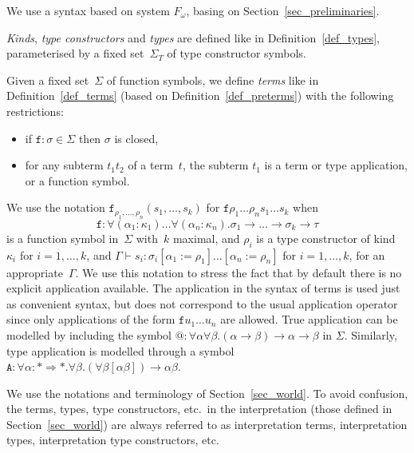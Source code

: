 \documentclass[runningheads,a4paper]{llncs}
\newcommand{\arrtype}{\rightarrow}
\newcommand{\arrkind}{\Rightarrow}
\newcommand{\proves}{\vdash}
\begin{document}
We use a syntax based on system $F_\omega$, basing on
Section~\ref{sec_preliminaries}.

\begin{definition}\normalfont
  \emph{Kinds}, \emph{type constructors} and \emph{types} are defined
  like in Definition~\ref{def_types}, parameterised by a fixed
  set~$\Sigma_T$ of type constructor symbols.

  Given a fixed set~$\Sigma$ of function symbols, we define
  \emph{terms} like in Definition~\ref{def_terms} (based on
  Definition~\ref{def_preterms}) with the following restrictions:
  \begin{itemize}
  \item if $\mathtt{f} : \sigma \in \Sigma$ then $\sigma$ is closed,
  \item for any subterm $t_1 t_2$ of a term~$t$, the subterm $t_1$ is
    a term or type application, or a function symbol.
  \end{itemize}
\end{definition}

We use the notation
$\mathtt{f}_{\rho_1,\ldots,\rho_n}(s_1,\ldots,s_k)$ for
$\mathtt{f} \rho_1 \ldots \rho_n s_1 \ldots s_k$ when
\[
  \mathtt{f} : \forall (\alpha_1 : \kappa_1) \ldots
  \forall (\alpha_n : \kappa_n) . \sigma_1 \arrtype \ldots \arrtype
  \sigma_k \arrtype \tau
\]
is a function symbol in~$\Sigma$ with~$k$ maximal, and $\rho_i$ is a
type constructor of kind $\kappa_i$ for $i=1,\ldots,k$, and
$\Gamma \proves s_i : \sigma_i[\alpha_1 := \rho_1]\ldots[\alpha_n :=
\rho_n]$ for $i=1,\ldots,k$, for an appropriate~$\Gamma$. We use this
notation to stress the fact that by default there is no explicit
application available. The application in the syntax of terms is used
just as convenient syntax, but does not correspond to the usual
application operator since only applications of the form
$\mathtt{f} u_1 \ldots u_n$ are allowed. True application can be
modelled by including the symbol
${@} : \forall\alpha\forall\beta . (\alpha \arrtype \beta) \arrtype
\alpha \arrtype \beta$ in $\Sigma$. Similarly, type application is
modelled through a symbol
$\mathtt{A} : \forall \alpha : * \arrkind * . \forall \beta . (\forall
\beta [\alpha \beta]) \arrtype \alpha \beta$.

We use the notations and terminology of Section~\ref{sec_world}. To
avoid confusion, the terms, types, type constructors, etc.~in the
interpretation (those defined in Section~\ref{sec_world}) are always
referred to as interpretation terms, interpretation types,
interpretation type constructors, etc.
\end{document}
